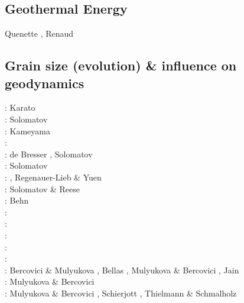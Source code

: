 \subsection{Geothermal Energy} 

\begin{scriptsize}
Quenette \etal \cite{quxm15}, Renaud \etal \cite{revf19}
\end{scriptsize}

\subsection{Grain size (evolution) \& influence on geodynamics}
\label{sec:topics:gsev}

\begin{scriptsize}
\nineteeneightyfour: Karato \cite{kara84}\\
\nineteenninetysix: Solomatov \cite{solo96}\\
\nineteenninetyseven: Kameyama \etal \cite{kayf97}\\
\nineteeneightynine: \cite{brcp99}\\
\twothousandone: de Bresser \etal \cite{dets01}, Solomatov \cite{solo01}\\
\twothousandtwo: Solomatov \etal \cite{soet02}\\
\twothousandthree: \cite{hapa03}, Regenauer-Lieb \& Yuen \cite{reyu03}\\
\twothousandeight: Solomatov \& Reese \cite{sore08}\\
\twothousandnine: Behn \etal \cite{behe09}\\
\twothousandeleven: \cite{rorb11}\\
\twothousandthirteen: \cite{beri13}\\
\twothousandfourteen: \cite{besr14}\\
\twothousandfifteen: \cite{thrk15}\cite{tukb15}\cite{pevp15}\cite{glfa15}\\
\twothousandseventeen: \cite{ceww17}\cite{daef17}\cite{mube17}\cite{scdu17}\\
\twothousandeighteen: Bercovici \& Mulyukova \cite{bemu18}, Bellas \etal \cite{bezb18},
                      Mulyukova \& Bercovici \cite{mube18}, Jain \etal \cite{jakk18}\\
\twothousandnineteen: Mulyukova \& Bercovici \cite{mube19}\\
\twothousandtwenty: Mulyukova \& Bercovici \cite{mube20}, Schierjott \etal \cite{scrt20,sctr20},
                    Thielmann \& Schmalholz \cite{thsc20}
\end{scriptsize}

